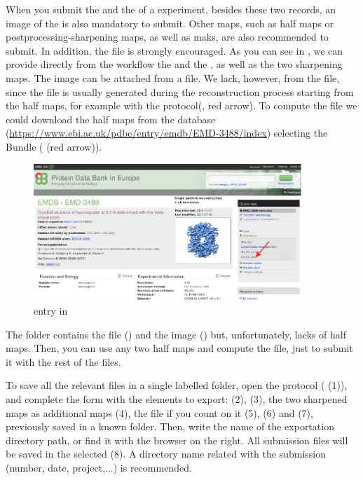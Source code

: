 When you submit the  and the  of a \cryoem experiment, besides these two records, an image of the  is also mandatory to submit. Other maps, such as half maps or postprocessing-sharpening maps, as well as maks, are also recommended to submit. In addition, the  file is strongly encouraged. As you can see in , we can provide directly from the workflow the  and the , as well as the two sharpening maps. The  image can be attached from a file. We lack, however, from the  file, since the  file is usually generated during the  reconstruction process starting from the half maps, for example with the  protocol(, red arrow). To compute the  file we could download the half maps from the database 
(\url{https://www.ebi.ac.uk/pdbe/entry/emdb/EMD-3488/index}) selecting the  Bundle ( (red arrow)).

 \begin{figure}[H]
  \centering 
  \captionsetup{width=.9\linewidth} 
  \includegraphics[width=0.9\textwidth]{Images/Fig77}
  \caption{ entry  in }
  \label{fig:export_to_EMDB_protocol_1}
  \end{figure}

The  folder contains the  file () and the  image () but, unfortunately, lacks of half maps. Then, you can use any two half maps and compute the  file, just to submit it with the rest of the files.
  
To save all the relevant files in a single labelled folder, open the  protocol ( (1)), and complete the form with the \scipion elements to export:  (2),  (3), the two sharpened maps as additional maps (4), the  file if you count on it (5),  (6) and  (7), previously saved in a known folder. Then, write the name of the exportation directory path, or find it with the browser on the right. All submission files will be saved in the  selected (8). A directory name related with the submission (number, date, project,...) is recommended. 
 

